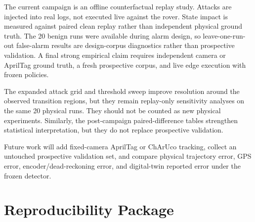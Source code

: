 \documentclass[conference]{IEEEtran}
\begin{document}
The current campaign is an offline counterfactual replay study. Attacks are
injected into real logs, not executed live against the rover. State impact is
measured against paired clean replay rather than independent physical ground
truth. The 20 benign runs were available during alarm design, so
leave-one-run-out false-alarm results are design-corpus diagnostics rather
than prospective validation. A final strong empirical claim requires
independent camera or AprilTag ground truth, a fresh prospective corpus, and
live edge execution with frozen policies.

The expanded attack grid and threshold sweep improve resolution around the
observed transition regions, but they remain replay-only sensitivity analyses
on the same 20 physical runs. They should not be counted as new physical
experiments. Similarly, the post-campaign paired-difference tables strengthen
statistical interpretation, but they do not replace prospective validation.

Future work will add fixed-camera AprilTag or ChArUco tracking, collect an
untouched prospective validation set, and compare physical trajectory error,
GPS error, encoder/dead-reckoning error, and digital-twin reported error under
the frozen detector.

\section{Reproducibility Package}
\label{sec:reproducibility}
\end{document}
